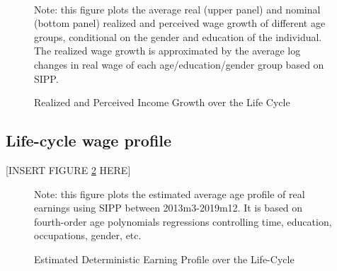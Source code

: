 \begin{figure}[!ht]
    	\caption{Realized and Perceived Income Growth over the Life Cycle}
    	\label{fig:growth_age_compare}
    	\begin{center}
    	 \\
    	\medskip
    	\end{center}
    	\begin{flushleft} Note: this figure plots the average real (upper panel) and nominal (bottom panel) realized and perceived wage growth of different age groups, conditional on the gender and education of the individual. The realized wage growth is approximated by the average log changes in real wage of each age/education/gender group based on SIPP.\end{flushleft}
    \end{figure}
    

\subsection{Life-cycle wage profile}
\label{appendix:life-cycle-determinstic}

\begin{center}
[INSERT FIGURE \ref{fig:life-cycle-determinstic} HERE]  
\end{center}

 \begin{figure}[!ht]
    	\caption{Estimated Deterministic Earning Profile over the Life-Cycle}
    	\label{fig:life-cycle-determinstic}
    	\begin{center}
    	\end{center}
    	\begin{flushleft}Note:  this figure plots the estimated average age profile of real earnings using SIPP between 2013m3-2019m12. It is based on fourth-order age polynomials regressions controlling time, education, occupations, gender, etc.\end{flushleft}
    \end{figure}
    
